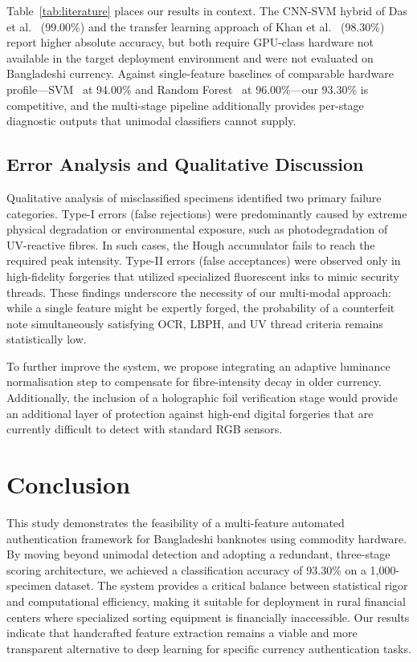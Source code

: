 \documentclass[10pt,a4paper,twocolumn,twoside]{article}
\begin{document}
Table~\ref{tab:literature} places our results in context. The
CNN-SVM hybrid of Das et al.~\cite{das2022} (99.00\%) and the
transfer learning approach of Khan et al.~\cite{khan2023} (98.30\%)
report higher absolute accuracy, but both require GPU-class hardware
not available in the target deployment environment and were not
evaluated on Bangladeshi currency. Against single-feature baselines
of comparable hardware profile---SVM~\cite{singh2020} at 94.00\%
and Random Forest~\cite{rao2020} at 96.00\%---our 93.30\% is
competitive, and the multi-stage pipeline additionally provides
per-stage diagnostic outputs that unimodal classifiers cannot supply.

\subsection{Error Analysis and Qualitative Discussion}

Qualitative analysis of misclassified specimens identified two primary failure categories. Type-I errors (false rejections) were predominantly caused by extreme physical degradation or environmental exposure, such as photodegradation of UV-reactive fibres. In such cases, the Hough accumulator fails to reach the required peak intensity. Type-II errors (false acceptances) were observed only in high-fidelity forgeries that utilized specialized fluorescent inks to mimic security threads. These findings underscore the necessity of our multi-modal approach: while a single feature might be expertly forged, the probability of a counterfeit note simultaneously satisfying OCR, LBPH, and UV thread criteria remains statistically low.

To further improve the system, we propose integrating an adaptive luminance normalisation step to compensate for fibre-intensity decay in older currency. Additionally, the inclusion of a holographic foil verification stage would provide an additional layer of protection against high-end digital forgeries that are currently difficult to detect with standard RGB sensors.

\section{Conclusion}
\label{sec:conclusion}
This study demonstrates the feasibility of a multi-feature automated authentication framework for Bangladeshi banknotes using commodity hardware. By moving beyond unimodal detection and adopting a redundant, three-stage scoring architecture, we achieved a classification accuracy of 93.30\% on a 1,000-specimen dataset. The system provides a critical balance between statistical rigor and computational efficiency, making it suitable for deployment in rural financial centers where specialized sorting equipment is financially inaccessible. Our results indicate that handcrafted feature extraction remains a viable and more transparent alternative to deep learning for specific currency authentication tasks.
\end{document}
